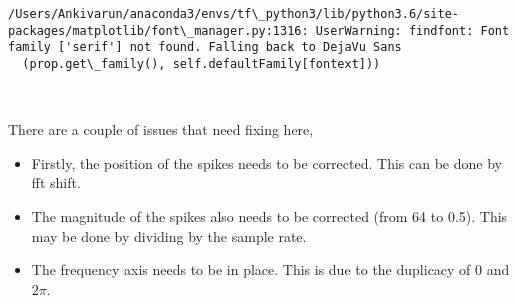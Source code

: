 \documentclass[11pt]{article}
\providecommand{\tightlist}{%
      \setlength{\itemsep}{0pt}\setlength{\parskip}{0pt}}
\begin{document}
    \begin{Verbatim}[commandchars=\\\{\}]
/Users/Ankivarun/anaconda3/envs/tf\_python3/lib/python3.6/site-packages/matplotlib/font\_manager.py:1316: UserWarning: findfont: Font family ['serif'] not found. Falling back to DejaVu Sans
  (prop.get\_family(), self.defaultFamily[fontext]))

    \end{Verbatim}

    \begin{center}
    \end{center}
    { \hspace*{\fill} \\}
    
    There are a couple of issues that need fixing here,

\begin{itemize}
\tightlist
\item
  Firstly, the position of the spikes needs to be corrected. This can be
  done by fft shift.
\item
  The magnitude of the spikes also needs to be corrected (from 64 to
  0.5). This may be done by dividing by the sample rate.
\item
  The frequency axis needs to be in place. This is due to the duplicacy
  of \(0\) and \(2\pi\).
\end{itemize}
\end{document}
